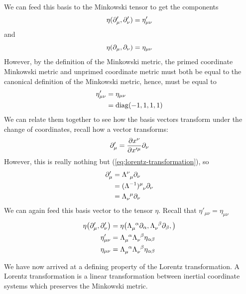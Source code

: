 		We can feed this basis to the Minkowski tensor to get the components
		\[
			\eta(\partial'_\mu,\partial'_\nu) = \eta'_{\mu\nu}
		\]
		and 
		\[
			\eta(\partial_\mu,\partial_\nu) = \eta_{\mu\nu}
		\]
		However, by the definition of the Minkowski metric, the primed coordinate
		Minkowski metric and unprimed coordinate metric must both be 
		equal to the canonical definition of the Minkowski metric, hence, 
		must be equal to
		\begin{align*}
			\eta'_{\mu\nu} 
			&= \eta_{\mu\nu}\\
			&= \operatorname{diag}(-1,1,1,1)
		\end{align*}
		We can relate them together to see 
		how the basis vectors transform under the change of coordinates,
		recall how a vector transforms:
		\[
			\partial'_\mu = \pdv{x^\nu}{x'^\mu}\partial_\nu
		\]
		However, this is really nothing but (\ref{eq:lorentz-transformation}), so
		\begin{align*}
			\p'_\mu 
			&= \Lambda\indices{^\nu_\mu}\p_\nu  \\
			&= (\Lambda\inv)\indices{^\mu_\nu}\p_\nu  \\
			&= 
			\Lambda\indices{_\nu^\mu}\p_\nu
		\end{align*}
		We can again feed this basis vector to the tensor $\eta$. Recall that $\eta'_{\mu\nu} = \eta_{\mu\nu}$
		\begin{align*}
		    \eta
			\pqty{
				\p'_\mu,
				\p'_\nu
			}
			&=
			\eta
			\qty(
				\Lambda\indices{_\mu^\alpha}
				\p_\alpha,
				\Lambda\indices{_\nu^\beta}
				\p_\beta,
			)\\
			\eta'_{\mu\nu}
			&=
			\Lambda\indices{_\mu^\alpha}
			\Lambda\indices{_\nu^\beta}
			\eta_{\alpha\beta}\\
			\eta_{\mu\nu}
			&=
			\Lambda\indices{_\mu^\alpha}
			\Lambda\indices{_\nu^\beta}
			\eta_{\alpha\beta}
		\end{align*}

		We have now arrived at a defining property of
		the Lorentz transformation. A Lorentz transformation is
		a linear transformation between inertial coordinate systems
		which preserves the Minkowski metric.

